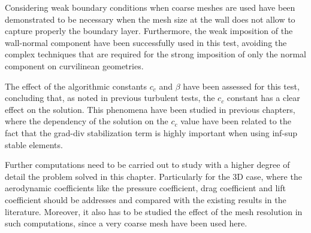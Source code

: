 Considering weak boundary conditions when coarse meshes are used have been demonstrated to be necessary when the mesh size at the wall does not allow to capture properly the boundary layer. Furthermore, the weak imposition of the wall-normal component have been successfully used in this test, avoiding the complex techniques that are required for the strong imposition of only the normal component on curvilinean geometries.

The effect of the algorithmic constants $ c_c $ and $ \beta $ have been assessed for this test, concluding that, as noted in previous turbulent tests, the $ c_c $ constant has a clear effect on the solution. This phenomena have been studied in previous chapters, where the dependency of the solution on the $ c_c $ value have been related to the fact that the grad-div stabilization term is highly important when using inf-sup stable elements.

Further computations need to be carried out to study with a higher degree of detail the problem solved in this chapter. Particularly for the 3D case, where the aerodynamic coefficients like the pressure coefficient, drag coefficient and lift coefficient should be addresses and compared with the existing results in the literature. Moreover, it also has to be studied the effect of the mesh resolution in such computations, since a very coarse mesh have been used here.



